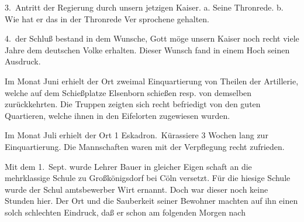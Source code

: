 

3.\ Antritt der Regierung durch unsern jetzigen Kaiser.\ob
a. Seine Thronrede.\ob
b. Wie hat er das in der Thronrede Ver\ohb
sprochene gehalten.

4.\ der Schluß bestand in dem Wunsche, Gott\ob
möge unsern Kaiser noch recht viele Jahre\ob
dem deutschen Volke erhalten. Dieser Wunsch\ob
fand in einem Hoch seinen Ausdruck.

\pend
{}
\pstart

Im Monat Juni erhielt der Ort zweimal\ob
Einquartierung von Theilen der Artillerie, welche\ob
auf dem Schießplatze Elsenborn schießen resp.\ob
von demselben zurückkehrten. Die Truppen\ob
zeigten sich recht befriedigt von den guten\ob
Quartieren, welche ihnen in den Eifelorten\ob
zugewiesen wurden.

Im Monat Juli erhielt der Ort 1 Eskadron.\ Kürassiere 3 Wochen lang zur Einquartierung.\ob
Die Mannschaften waren mit der Verpflegung recht\ob
zufrieden.

\pend
{}
\pstart

Mit dem 1.\ Sept. wurde Lehrer Bauer in gleicher Eigen\ohb
schaft an die mehrklassige Schule zu Großkönigsdorf bei\ob
Cöln versetzt. Für die hiesige Schule wurde der Schul\ohb
amtsbewerber Wirt ernannt. Doch war dieser noch keine Stunden hier. Der Ort und die Sauberkeit\unsicher\ob
seiner Bewohner machten auf ihn einen solch schlechten\ob
Eindruck, daß er schon am folgenden Morgen nach
\pend
